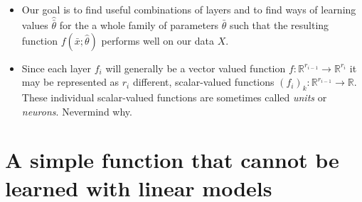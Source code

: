 \documentclass{article}
\begin{document}
\begin{itemize}
 
\item  Our goal is to find useful combinations of layers and to find ways of learning values $\hat{\bar{\theta}}$ for the a whole family of parameters $\bar{\theta}$ such that the resulting function $f(\bar{x}; \hat{\theta})$ performs well on our data $X$.
 
\item Since each layer $f_{i}$ will generally be a vector valued function $f:\mathbb{R}^{r_{i-1}} \rightarrow \mathbb{R}^{r_{i}}$ it may be represented as $r_{i}$ different, scalar-valued functions $(f_{i})_{k}:  \mathbb{R}^{r_{i-1}} \rightarrow \mathbb{R}.$  These individual scalar-valued functions are sometimes called \emph{units} or \emph{neurons}. Nevermind why.

\end{itemize}
\section{A simple function that cannot be learned with linear models}
\end{document}
